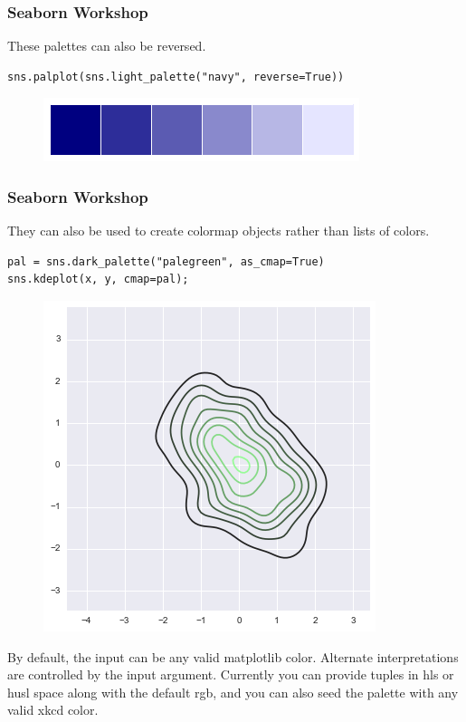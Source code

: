 \documentclass{beamer}
\begin{document}
\begin{frame}[fragile]
	\frametitle{Seaborn Workshop}
	\large
These palettes can also be reversed.
\begin{verbatim}
sns.palplot(sns.light_palette("navy", reverse=True))
\end{verbatim}
\begin{figure}
\centering
\includegraphics[width=0.7\linewidth]{images/color_palettes_46_0}
\caption{}
\label{fig:color_palettes_46_0}
\end{figure}


\end{frame}
\begin{frame}[fragile]
\frametitle{Seaborn Workshop}
\large

They can also be used to create colormap objects rather than lists of colors.
\begin{verbatim}
pal = sns.dark_palette("palegreen", as_cmap=True)
sns.kdeplot(x, y, cmap=pal);
\end{verbatim}

\begin{figure}
\centering
\includegraphics[width=0.7\linewidth]{images/color_palettes_48_0}
\caption{}
\label{fig:color_palettes_48_0}
\end{figure}

By default, the input can be any valid matplotlib color. Alternate interpretations are controlled by the input argument. Currently you can provide tuples in hls or husl space along with the default rgb, and you can also seed the palette with any valid xkcd color.
\end{frame}
\end{document}
